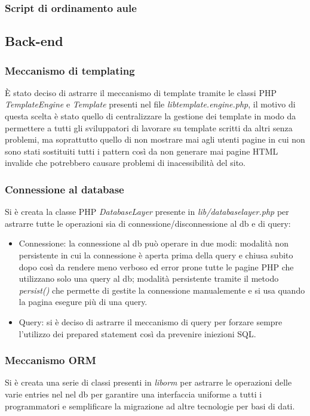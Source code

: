 \subsubsection{Script di ordinamento aule}

\subsection{Back-end}

\subsubsection{Meccanismo di templating}
È stato deciso di astrarre il meccanismo di template tramite le classi PHP
\textit{TemplateEngine} e \textit{Template} presenti nel file 
\textit{lib\slshape template.engine.php}, il motivo di questa scelta è stato
quello di centralizzare la gestione dei template in modo da permettere a tutti
gli sviluppatori di lavorare su template scritti da altri senza problemi, ma
soprattutto quello di non mostrare mai agli utenti pagine in cui non sono stati
sostituiti tutti i pattern così da non generare mai pagine HTML invalide che
potrebbero causare problemi di inacessibilità del sito.

\subsubsection{Connessione al database}
Si è creata la classe PHP \textit{DatabaseLayer} presente in
\textit{lib/databaselayer.php} per astrarre tutte le operazioni sia di
connessione/disconnessione al db e di query:
\begin{itemize}
    \item Connessione: la connessione al db può operare in due modi: modalità
        non persistente in cui la connessione è aperta prima della query e
        chiusa subito dopo così da rendere meno verboso ed error prone tutte le
        pagine PHP che utilizzano solo una query al db; modalità persistente
        tramite il metodo \textit{persist()} che permette di gestite la
        connessione manualemente e si usa quando la pagina esegure più di una
        query.
    \item Query: si è deciso di astrarre il meccanismo di query per forzare
        sempre l'utilizzo dei prepared statement così da prevenire iniezioni
        SQL.
\end{itemize}

\subsubsection{Meccanismo ORM}
Si è creata una serie di classi presenti in \textit{lib\slshape orm\slshape}
per astrarre le operazioni delle varie entries nel nel db per garantire una
interfaccia uniforme a tutti i programmatori e semplificare la migrazione ad
altre tecnologie per basi di dati.\\

